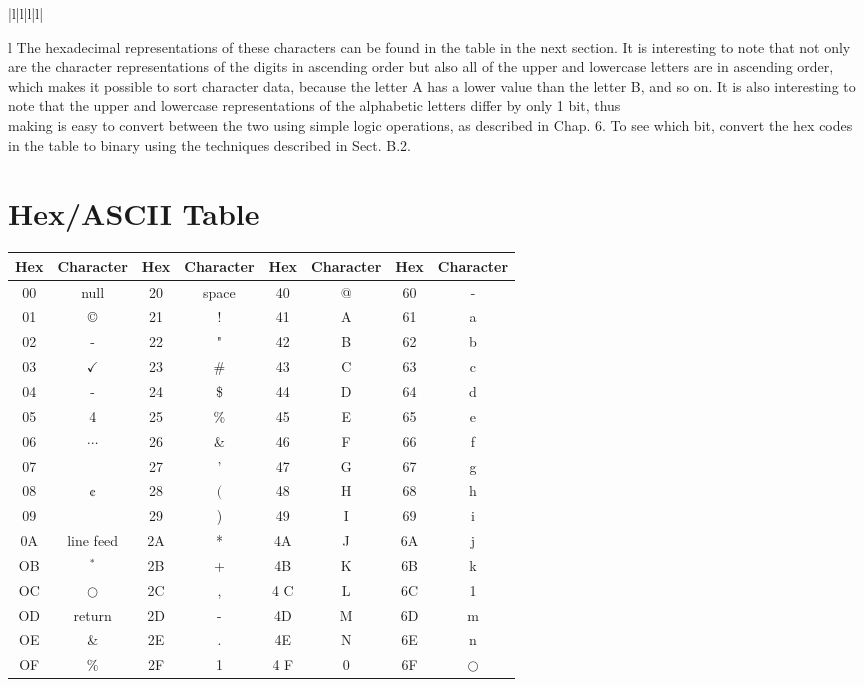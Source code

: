 \documentclass[10pt]{book}
\begin{document}
\begin{center}
\begin{tabular}{|l|l|l|l|}
\begin{tabular}{l}
The hexadecimal representations of these characters can be found in the table in the next section. It is interesting to note that not only are the character representations of the digits in ascending order but also all of the upper and lowercase letters are in ascending order, which makes it possible to sort character data, because the letter A has a lower value than the letter B, and so on. It is also interesting to note that the upper and lowercase representations of the alphabetic letters differ by only 1 bit, thus\\
making is easy to convert between the two using simple logic operations, as described in Chap. 6. To see which bit, convert the hex codes in the table to binary using the techniques described in Sect. B.2.

\section{Hex/ASCII Table}
\begin{center}
\begin{tabular}{|c|c|c|c|c|c|c|c|}
\hline
Hex & Character & Hex & Character & Hex & Character & Hex & Character \\
\hline
00 & null & 20 & space & 40 & @ & 60 & - \\
\hline
01 & © & 21 & ! & 41 & A & 61 & a \\
\hline
02 & - & 22 & " & 42 & B & 62 & b \\
\hline
03 & $\checkmark$ & 23 & \# & 43 & C & 63 & c \\
\hline
04 & - & 24 & \$ & 44 & D & 64 & d \\
\hline
05 & 4 & 25 & \% & 45 & E & 65 & e \\
\hline
06 & $\cdots$ & 26 & \& & 46 & F & 66 & f \\
\hline
07 &  & 27 & ' & 47 & G & 67 & g \\
\hline
08 & ¢ & 28 & $($ & 48 & H & 68 & h \\
\hline
09 &  & 29 & ) & 49 & I & 69 & i \\
\hline
0A & line feed & 2A & * & 4A & J & 6A & j \\
\hline
OB & ${ }^{*}$ & 2B & + & 4B & K & 6B & k \\
\hline
OC & $\bigcirc$ & 2C & , & 4 C & L & 6C & 1 \\
\hline
OD & return & 2D & - & 4D & M & 6D & m \\
\hline
OE & \& & 2E & . & 4E & N & 6E & n \\
\hline
OF & \% & 2F & 1 & 4 F & 0 & 6F & $\bigcirc$ \\

\end{tabular}
\end{center}
\end{tabular}
\end{tabular}
\end{center}
\end{document}
